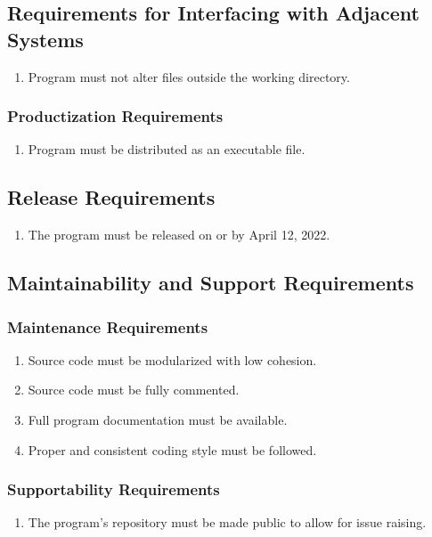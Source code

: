 \documentclass[12pt, titlepage]{article}
\begin{document}
\subsection{Requirements for Interfacing with Adjacent Systems}
\begin{enumerate}[label=PE\arabic*., resume=pes]
    \item Program must not alter files outside the working directory.
\end{enumerate} 

\subsubsection{Productization Requirements}
\begin{enumerate}[label=PE\arabic*., resume=pes]
    \item Program must be distributed as an executable file.
\end{enumerate} 

\subsection{Release Requirements}
\begin{enumerate}[label=RR\arabic*., series=rrs]
    \item The program must be released on or by April 12, 2022.
\end{enumerate} 

\subsection{Maintainability and Support Requirements}

\subsubsection{Maintenance Requirements}
\begin{enumerate}[label=MA\arabic*., series=mas]
    \item Source code must be modularized with low cohesion.
    \item Source code must be fully commented.
    \item Full program documentation must be available.
    \item Proper and consistent coding style must be followed.
\end{enumerate} 
\subsubsection{Supportability Requirements}
\begin{enumerate}[label=MA\arabic*., resume=mas]
    \item The program's repository must be made public to allow for issue raising.
\end{enumerate}
\end{document}
